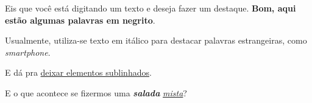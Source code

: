 \documentclass{article}
\begin{document}
	Eis que você está digitando um texto e deseja fazer um destaque. \textbf{Bom, aqui estão algumas palavras em negrito}.

	Usualmente, utiliza-se texto em itálico para destacar palavras estrangeiras, como \textit{smartphone}.

	E dá pra \underline{deixar elementos sublinhados}.

	E o que acontece se fizermos uma \textbf{\textit{salada}} \textit{\underline{mista}}?
\end{document}
